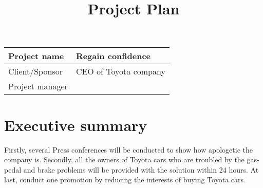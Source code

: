 \documentclass{report}
\begin{document}
 
\title{Project Plan} 
\maketitle 

\begin{table}[h]
\begin{tabular}{| l | l |}
	\hline
	Project name & Regain confidence \\
	\hline
	Client/Sponsor & CEO of Toyota company \\
	\hline
	Project manager & 		\\
	\hline
\end{tabular}
\end{table} 

\chapter{Executive summary} 
Firstly, several Press conferences will be conducted to show how apologetic the company is. Secondly, all the owners of Toyota cars who are troubled
by the gas-pedal and brake problems will be provided with the solution within 24 hours. At last, conduct one promotion by reducing the interests of 
buying Toyota cars.
\end{document}
